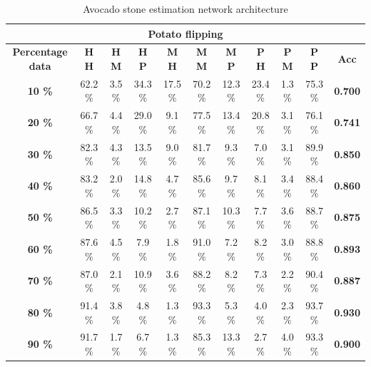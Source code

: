 \documentclass[11pt]{article}
\begin{document}
  \begin{table}[h!]
  \centering
  \begin{adjustbox}{max width=\textwidth}
  \begin{tabular}{*{11}{c}}%
  \hline
  \multicolumn{11}{c}{\textbf{Potato flipping}}
  \\
\hline
 \textbf{Percentage data} & \textbf{H H} & \textbf{H M} & \textbf{H P} & \textbf{M H} & \textbf{M M} & \textbf{M P} & \textbf{P H} & \textbf{P M} & \textbf{P P} & \textbf{Acc}\\
 \hline
 \hline
 \textbf{10 \%}  & 62.2 \% & 3.5 \% & 34.3 \% & 17.5 \% & 70.2 \% & 12.3 \% & 23.4 \% & 1.3 \% & 75.3 \% & \textbf{0.700} \\
 \hline
 \textbf{20 \%} & 66.7 \% & 4.4 \% & 29.0 \% & 9.1 \% & 77.5 \% & 13.4 \% & 20.8 \% & 3.1 \% & 76.1 \% & \textbf{0.741} \\
 \hline
 \textbf{30 \%} & 82.3 \% & 4.3 \% & 13.5 \% & 9.0 \% & 81.7 \% & 9.3 \% & 7.0 \% & 3.1 \% & 89.9 \% & \textbf{0.850} \\
 \hline
 \textbf{40 \%} & 83.2 \% & 2.0 \% & 14.8 \% & 4.7 \% & 85.6 \% & 9.7 \% & 8.1 \% & 3.4 \%  & 88.4 \% & \textbf{0.860} \\
 \hline
 \textbf{50 \%} & 86.5 \% & 3.3 \% & 10.2 \% & 2.7 \% & 87.1 \% & 10.3 \% & 7.7 \% & 3.6 \% & 88.7 \% & \textbf{0.875} \\
 \hline
 \textbf{60 \%} & 87.6 \% & 4.5 \% & 7.9 \% & 1.8 \% & 91.0 \% & 7.2 \% & 8.2 \% & 3.0 \% & 88.8 \% & \textbf{0.893} \\
 \hline
 \textbf{70 \%} & 87.0 \% & 2.1 \% & 10.9 \% & 3.6 \% & 88.2 \% & 8.2 \% & 7.3 \% & 2.2 \% & 90.4 \% & \textbf{0.887} \\
 \hline
\textbf{80 \%} & 91.4 \% & 3.8 \% & 4.8 \%  & 1.3 \% & 93.3 \% & 5.3 \% & 4.0 \% & 2.3 \% & 93.7 \% & \textbf{0.930} \\
 \hline
 \textbf{90 \%} & 91.7 \% & 1.7 \% & 6.7 \% & 1.3 \% & 85.3 \% & 13.3 \% & 2.7 \% & 4.0 \% & 93.3 \% & \textbf{0.900} \\
 \hline
\end{tabular}
\end{adjustbox}
  \caption{Avocado stone estimation network architecture}
  \label{tab:experiments_avo_cnn}
\end{table}
\end{document}
